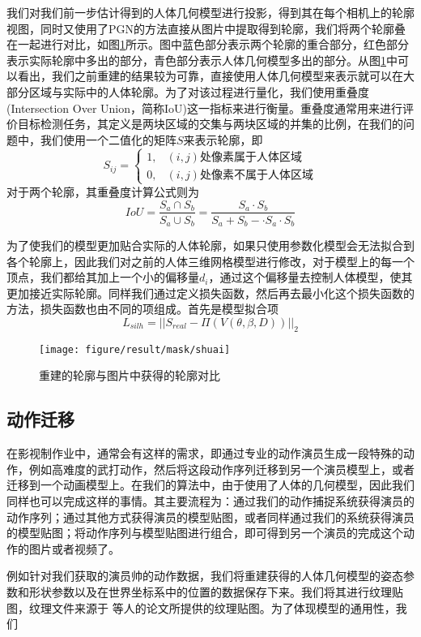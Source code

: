 我们对我们前一步估计得到的人体几何模型进行投影，得到其在每个相机上的轮廓视图，同时又使用了PGN的方法直接从图片中提取得到轮廓，我们将两个轮廓叠在一起进行对比，如图\ref{fig:maskcom}所示。图中蓝色部分表示两个轮廓的重合部分，红色部分表示实际轮廓中多出的部分，青色部分表示人体几何模型多出的部分。从图\ref{fig:maskcom}中可以看出，我们之前重建的结果较为可靠，直接使用人体几何模型来表示就可以在大部分区域与实际中的人体轮廓。为了对该过程进行量化，我们使用重叠度(Intersection Over Union，简称IoU)这一指标来进行衡量。重叠度通常用来进行评价目标检测任务，其定义是两块区域的交集与两块区域的并集的比例，在我们的问题中，我们使用一个二值化的矩阵\(S\)来表示轮廓，即
\begin{equation}
    S_{ij} = \begin{cases}
        1, & \text{\((i,j)\)处像素属于人体区域} \\
        0, & \text{\((i,j)\)处像素不属于人体区域}
    \end{cases}
\end{equation}
对于两个轮廓，其重叠度计算公式则为
\begin{equation}
    IoU = \frac{S_a \cap S_b}{S_a \cup S_b} = \frac{S_a \cdot S_b}{S_a + S_b - \cdot S_a\cdot S_b}
\end{equation}

为了使我们的模型更加贴合实际的人体轮廓，如果只使用参数化模型会无法拟合到各个轮廓上，因此我们对之前的人体三维网格模型进行修改，对于模型上的每一个顶点，我们都给其加上一个小的偏移量\(d_i\)，通过这个偏移量去控制人体模型，使其更加接近实际轮廓。同样我们通过定义损失函数，然后再去最小化这个损失函数的方法，损失函数也由不同的项组成。首先是模型拟合项
\begin{equation}
    L_{silh} = || S_{real} - \Pi(V(\theta, \beta, D)) ||_2
\end{equation}


\begin{figure}[htbp]
    \centering
    \texttt{[image: figure/result/mask/shuai]}
    \caption{\label{fig:maskcom} 重建的轮廓与图片中获得的轮廓对比}
\end{figure}

\subsection{动作迁移}
在影视制作业中，通常会有这样的需求，即通过专业的动作演员生成一段特殊的动作，例如高难度的武打动作，然后将这段动作序列迁移到另一个演员模型上，或者迁移到一个动画模型上。在我们的算法中，由于使用了人体的几何模型，因此我们同样也可以完成这样的事情。其主要流程为：通过我们的动作捕捉系统获得演员的动作序列；通过其他方式获得演员的模型贴图，或者同样通过我们的系统获得演员的模型贴图；将动作序列与模型贴图进行组合，即可得到另一个演员的完成这个动作的图片或者视频了。

例如针对我们获取的演员帅的动作数据，我们将重建获得的人体几何模型的姿态参数和形状参数以及在世界坐标系中的位置的数据保存下来。我们将其进行纹理贴图，纹理文件来源于 等人的论文所提供的纹理贴图\cite{surreal}。为了体现模型的通用性，我们


